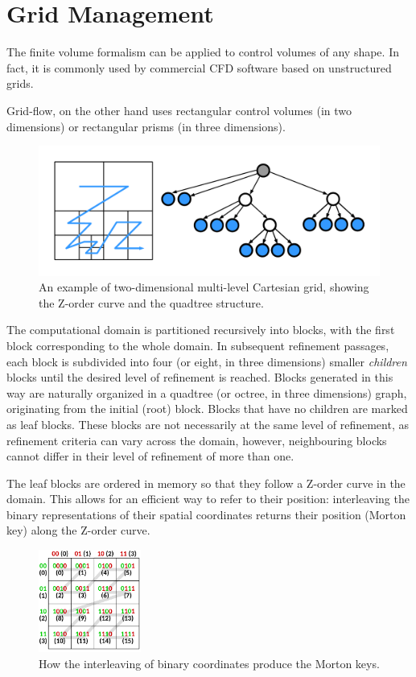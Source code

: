 \documentclass[11pt, a4paper, oneside, openany]{book}
\begin{document}
\section{Grid Management}\label{Chapter_Solver_Section_Grid_Management}
The finite volume formalism can be applied to control volumes of any shape. In fact, it is commonly used by commercial CFD software based on unstructured grids.\par
Grid-flow, on the other hand uses rectangular control volumes (in two dimensions) or rectangular prisms (in three dimensions).
\begin{figure}[!ht]
	\centering
	\includegraphics[height=0.4\textwidth]{MultilevelGridAndQuadtree.pdf}
	\caption[Multilevel Grid and Quadtree]{An example of two-dimensional multi-level Cartesian grid, showing the Z-order curve and the quadtree structure.}
	\label{MultilevelGridAndQuadtree}
\end{figure}\noindent
The computational domain is partitioned recursively into blocks, with the first block corresponding to the whole domain. In subsequent refinement passages, each block is subdivided into four (or eight, in three dimensions) smaller \textit{children} blocks until the desired level of refinement is reached. Blocks generated in this way are naturally organized in a quadtree (or octree, in three dimensions) graph, originating from the initial (root) block. Blocks that have no children are marked as leaf blocks. These blocks are not necessarily at the same level of refinement, as refinement criteria can vary across the domain, however, neighbouring blocks cannot differ in their level of refinement of more than one.\par
The leaf blocks are ordered in memory so that they follow a Z-order curve in the domain. This allows for an efficient way to refer to their position: interleaving the binary representations of their spatial coordinates returns their position (Morton key) along the Z-order curve.\par
\begin{figure}[!ht]
	\centering
	\includegraphics[width=0.3\textwidth]{MortonKeys.pdf}
	\caption[Morton Keys]{How the interleaving of binary coordinates produce the Morton keys.}
	\label{MortonKeys}
\end{figure}\noindent
\end{document}
